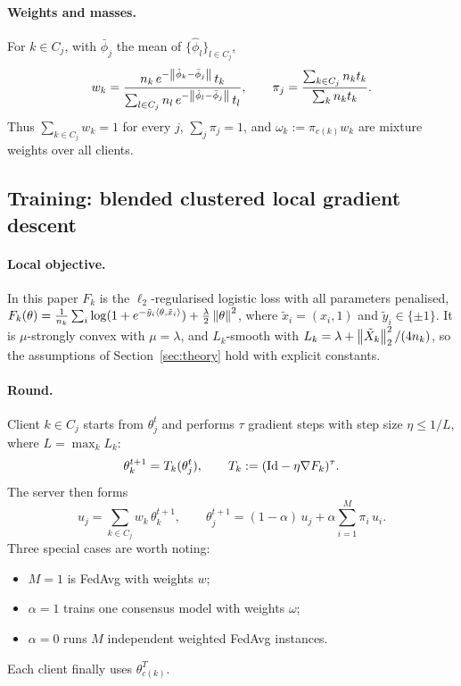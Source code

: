 \paragraph{Weights and masses.}
For $k\in C_j$, with $\bar\phi_j$ the mean of $\{\hat\phi_l\}_{l\in C_j}$,
\begin{equation}
  w_k=\frac{n_k\,e^{-\left\lVert \hat\phi_k-\bar\phi_j \right\rVert}\,t_k}{\sum_{l\in C_j}n_l\,e^{-\left\lVert \hat\phi_l-\bar\phi_j \right\rVert}\,t_l},
  \qquad
  \pi_j=\frac{\sum_{k\in C_j}n_k t_k}{\sum_{k}n_k t_k}.
  \label{eq:weights}
\end{equation}
Thus $\sum_{k\in C_j}w_k=1$ for every $j$, $\sum_j\pi_j=1$, and $\omega_k:=\pi_{c(k)}w_k$
are mixture weights over all clients.

\subsection{Training: blended clustered local gradient descent}
\label{sec:training}

\paragraph{Local objective.}
In this paper $F_k$ is the $\ell_2$-regularised logistic loss with all parameters penalised,
$F_k(\theta)=\frac1{n_k}\sum_i\log(1+e^{-\tilde y_i\langle\theta,\tilde x_i\rangle})+\frac\lambda2\left\lVert \theta \right\rVert^2$,
where $\tilde x_i=(x_i,1)$ and $\tilde y_i\in\{\pm1\}$. It is $\mu$-strongly convex with
$\mu=\lambda$, and $L_k$-smooth with $L_k=\lambda+\left\lVert \tilde X_k \right\rVert_2^2/(4n_k)$, so the
assumptions of Section~\ref{sec:theory} hold with explicit constants.

\paragraph{Round.}
Client $k\in C_j$ starts from $\theta^t_j$ and performs $\tau$ gradient steps with step size
$\eta\le1/L$, where $L=\max_k L_k$:
\[
  \theta_k^{t+1}=T_k(\theta_j^t),\qquad T_k:=(\mathrm{Id}-\eta\nabla F_k)^{\tau}.
\]
The server then forms
\begin{equation}
  u_j=\sum_{k\in C_j}w_k\,\theta_k^{t+1},
  \qquad
  \theta_j^{t+1}=(1-\alpha)\,u_j+\alpha\sum_{i=1}^M\pi_i\,u_i .
  \label{eq:round}
\end{equation}
Three special cases are worth noting:
\begin{itemize}[leftmargin=1.2em,itemsep=2pt]
  \item $M=1$ is FedAvg with weights $w$;
  \item $\alpha=1$ trains one consensus model with weights $\omega$;
  \item $\alpha=0$ runs $M$ independent weighted FedAvg instances.
\end{itemize}
Each client finally uses $\theta^T_{c(k)}$.

